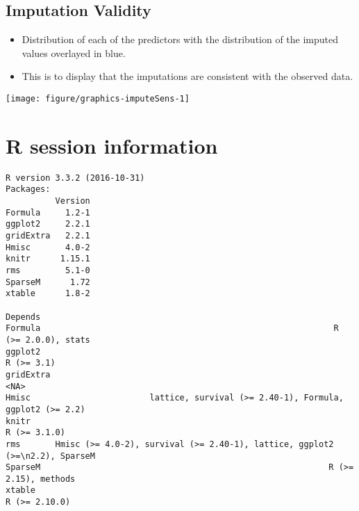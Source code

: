 \documentclass[10pt]{article}\usepackage[]{graphicx}\usepackage[]{color}
\makeatletter
\def\maxwidth{ %
  \ifdim\Gin@nat@width>\linewidth
    \linewidth
  \else
    \Gin@nat@width
  \fi
}
\newenvironment{kframe}{%
 \def\at@end@of@kframe{}%
 \ifinner\ifhmode%
  \def\at@end@of@kframe{\end{minipage}}%
  \begin{minipage}{\columnwidth}%
 \fi\fi%
 \def\FrameCommand##1{\hskip\@totalleftmargin \hskip-\fboxsep
 \colorbox{shadecolor}{##1}\hskip-\fboxsep
     \hskip-\linewidth \hskip-\@totalleftmargin \hskip\columnwidth}%
 \MakeFramed {\advance\hsize-\width
   \@totalleftmargin\z@ \linewidth\hsize
   \@setminipage}}%
 {\par\unskip\endMakeFramed%
 \at@end@of@kframe}
\newenvironment{knitrout}{}{} %
\makeatother
\begin{document}
\clearpage
\begin{landscape}
\subsection{Imputation Validity}

\begin{itemize}
  \item Distribution of each of the predictors with the distribution of the imputed values overlayed in blue. 
  \item This is to display that the imputations are consistent with the observed data.
\end{itemize}

\begin{knitrout}
\color{fgcolor}

{\centering \texttt{[image: figure/graphics-imputeSens-1]} 

}



\end{knitrout}
\end{landscape}






\clearpage
\section{R session information}
\small
\begin{knitrout}
\color{fgcolor}\begin{kframe}
\begin{verbatim}
R version 3.3.2 (2016-10-31) 
Packages:
          Version
Formula     1.2-1
ggplot2     2.2.1
gridExtra   2.2.1
Hmisc       4.0-2
knitr      1.15.1
rms         5.1-0
SparseM      1.72
xtable      1.8-2
                                                                              Depends
Formula                                                           R (>= 2.0.0), stats
ggplot2                                                                    R (>= 3.1)
gridExtra                                                                        <NA>
Hmisc                        lattice, survival (>= 2.40-1), Formula, ggplot2 (>= 2.2)
knitr                                                                    R (>= 3.1.0)
rms       Hmisc (>= 4.0-2), survival (>= 2.40-1), lattice, ggplot2 (>=\n2.2), SparseM
SparseM                                                          R (>= 2.15), methods
xtable                                                                  R (>= 2.10.0)
\end{verbatim}
\end{kframe}
\end{knitrout}
\end{document}
